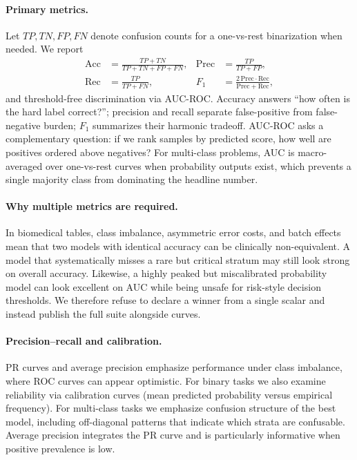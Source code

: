 \documentclass[10pt,journal]{IEEEtran}
\begin{document}
\paragraph{Primary metrics.}
Let $TP,TN,FP,FN$ denote confusion counts for a one-vs-rest binarization when needed. We report
\begin{align}
\mathrm{Acc}&=\frac{TP+TN}{TP+TN+FP+FN},&
\mathrm{Prec}&=\frac{TP}{TP+FP},\\
\mathrm{Rec}&=\frac{TP}{TP+FN},&
F_1&=\frac{2\,\mathrm{Prec}\cdot\mathrm{Rec}}{\mathrm{Prec}+\mathrm{Rec}},
\end{align}
and threshold-free discrimination via AUC-ROC. Accuracy answers ``how often is the hard label
correct?''; precision and recall separate false-positive from false-negative burden; $F_1$
summarizes their harmonic tradeoff. AUC-ROC asks a complementary question: if we rank samples
by predicted score, how well are positives ordered above negatives? For multi-class problems,
AUC is macro-averaged over one-vs-rest curves when probability outputs exist, which prevents a
single majority class from dominating the headline number.

\paragraph{Why multiple metrics are required.}
In biomedical tables, class imbalance, asymmetric error costs, and batch effects mean that two
models with identical accuracy can be clinically non-equivalent. A model that systematically
misses a rare but critical stratum may still look strong on overall accuracy. Likewise, a
highly peaked but miscalibrated probability model can look excellent on AUC while being unsafe
for risk-style decision thresholds. We therefore refuse to declare a winner from a single
scalar and instead publish the full suite alongside curves.

\paragraph{Precision--recall and calibration.}
PR curves and average precision emphasize performance under class imbalance, where ROC curves
can appear optimistic. For binary tasks we also examine reliability via calibration curves
(mean predicted probability versus empirical frequency). For multi-class tasks we emphasize
confusion structure of the best model, including off-diagonal patterns that indicate which
strata are confusable. Average precision integrates the PR curve and is particularly informative
when positive prevalence is low.
\end{document}
